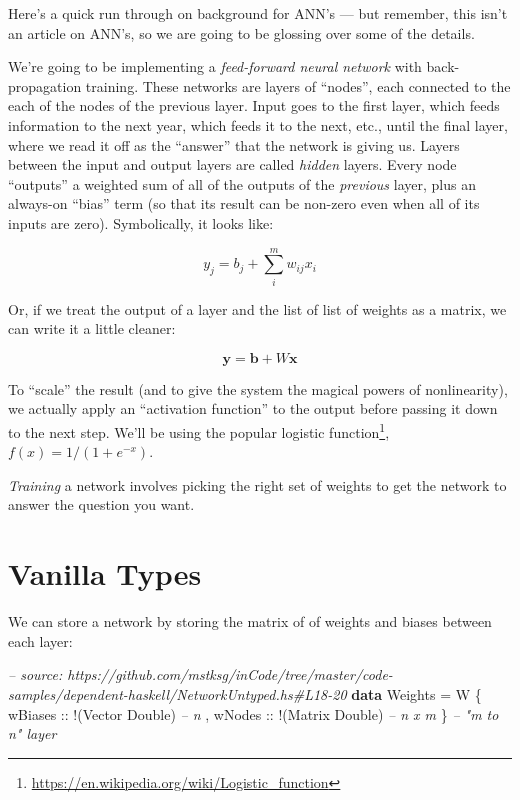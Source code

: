\documentclass[]{article}
\newenvironment{Shaded}{}{}
\newcommand{\KeywordTok}[1]{\textcolor[rgb]{0.00,0.44,0.13}{\textbf{{#1}}}}
\newcommand{\DataTypeTok}[1]{\textcolor[rgb]{0.56,0.13,0.00}{{#1}}}
\newcommand{\CommentTok}[1]{\textcolor[rgb]{0.38,0.63,0.69}{\textit{{#1}}}}
\newcommand{\OtherTok}[1]{\textcolor[rgb]{0.00,0.44,0.13}{{#1}}}
\newcommand{\FunctionTok}[1]{\textcolor[rgb]{0.02,0.16,0.49}{{#1}}}
\newcommand{\NormalTok}[1]{{#1}}
\renewcommand{\href}[2]{#2\footnote{\url{#1}}}
\begin{document}
Here's a quick run through on background for ANN's --- but remember,
this isn't an article on ANN's, so we are going to be glossing over some
of the details.

We're going to be implementing a \emph{feed-forward neural network} with
back-propagation training. These networks are layers of ``nodes'', each
connected to the each of the nodes of the previous layer. Input goes to
the first layer, which feeds information to the next year, which feeds
it to the next, etc., until the final layer, where we read it off as the
``answer'' that the network is giving us. Layers between the input and
output layers are called \emph{hidden} layers. Every node ``outputs'' a
weighted sum of all of the outputs of the \emph{previous} layer, plus an
always-on ``bias'' term (so that its result can be non-zero even when
all of its inputs are zero). Symbolically, it looks like:

\[
y_j = b_j + \sum_i^m w_{ij} x_i
\]

Or, if we treat the output of a layer and the list of list of weights as
a matrix, we can write it a little cleaner:

\[
\mathbf{y} = \mathbf{b} + W \mathbf{x}
\]

To ``scale'' the result (and to give the system the magical powers of
nonlinearity), we actually apply an ``activation function'' to the
output before passing it down to the next step. We'll be using the
popular \href{https://en.wikipedia.org/wiki/Logistic_function}{logistic
function}, \(f(x) = 1 / (1 + e^{-x})\).

\emph{Training} a network involves picking the right set of weights to
get the network to answer the question you want.

\section{Vanilla Types}\label{vanilla-types}

We can store a network by storing the matrix of of weights and biases
between each layer:

\begin{Shaded}
\begin{Highlighting}[]
\CommentTok{-- source: https://github.com/mstksg/inCode/tree/master/code-samples/dependent-haskell/NetworkUntyped.hs#L18-20}
\KeywordTok{data} \DataTypeTok{Weights} \FunctionTok{=} \DataTypeTok{W} \NormalTok{\{}\OtherTok{ wBiases ::} \FunctionTok{!}\NormalTok{(}\DataTypeTok{Vector} \DataTypeTok{Double}\NormalTok{)  }\CommentTok{-- n}
                 \NormalTok{,}\OtherTok{ wNodes  ::} \FunctionTok{!}\NormalTok{(}\DataTypeTok{Matrix} \DataTypeTok{Double}\NormalTok{)  }\CommentTok{-- n x m}
                 \NormalTok{\}                              }\CommentTok{-- "m to n" layer}
\end{Highlighting}
\end{Shaded}
\end{document}

